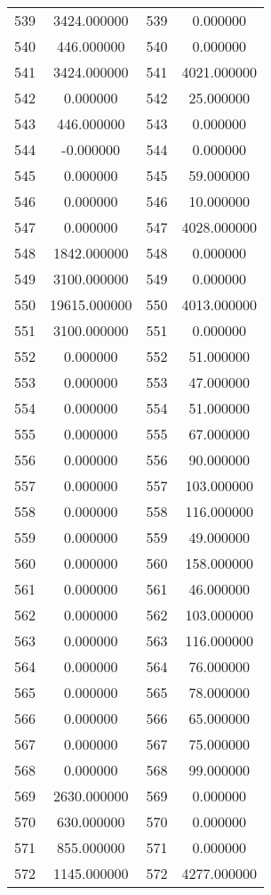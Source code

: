 \documentclass[12pt]{article}
\begin{document}
\begin{longtable}{@{}cccc@{}}
539 & 3424.000000 & 539 & 0.000000 \\
540 & 446.000000 & 540 & 0.000000 \\
541 & 3424.000000 & 541 & 4021.000000 \\
542 & 0.000000 & 542 & 25.000000 \\
543 & 446.000000 & 543 & 0.000000 \\
544 & -0.000000 & 544 & 0.000000 \\
545 & 0.000000 & 545 & 59.000000 \\
546 & 0.000000 & 546 & 10.000000 \\
547 & 0.000000 & 547 & 4028.000000 \\
548 & 1842.000000 & 548 & 0.000000 \\
549 & 3100.000000 & 549 & 0.000000 \\
550 & 19615.000000 & 550 & 4013.000000 \\
551 & 3100.000000 & 551 & 0.000000 \\
552 & 0.000000 & 552 & 51.000000 \\
553 & 0.000000 & 553 & 47.000000 \\
554 & 0.000000 & 554 & 51.000000 \\
555 & 0.000000 & 555 & 67.000000 \\
556 & 0.000000 & 556 & 90.000000 \\
557 & 0.000000 & 557 & 103.000000 \\
558 & 0.000000 & 558 & 116.000000 \\
559 & 0.000000 & 559 & 49.000000 \\
560 & 0.000000 & 560 & 158.000000 \\
561 & 0.000000 & 561 & 46.000000 \\
562 & 0.000000 & 562 & 103.000000 \\
563 & 0.000000 & 563 & 116.000000 \\
564 & 0.000000 & 564 & 76.000000 \\
565 & 0.000000 & 565 & 78.000000 \\
566 & 0.000000 & 566 & 65.000000 \\
567 & 0.000000 & 567 & 75.000000 \\
568 & 0.000000 & 568 & 99.000000 \\
569 & 2630.000000 & 569 & 0.000000 \\
570 & 630.000000 & 570 & 0.000000 \\
571 & 855.000000 & 571 & 0.000000 \\
572 & 1145.000000 & 572 & 4277.000000 \\

\end{longtable}
\end{document}
